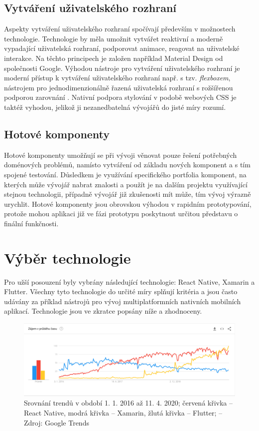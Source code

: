 \subsection{Vytváření uživatelského rozhraní}

Aspekty vytváření uživatelského rozhraní spočívají především v možnostech technologie. Technologie by měla umožnit vytvářet reaktivní a moderně vypadající uživatelská rozhraní, podporovat animace, reagovat na uživatelské interakce. Na těchto principech je založen například Material Design od společnosti Google. Výhodou nástroje pro vytváření uživatelského rozhraní je moderní přístup k vytváření uživatelského rozhraní např. s tzv. \emph{flexboxem}, nástrojem pro jednodimenzionálně řazená uživatelská rozhraní s rožšířenou podporou zarovnání \cite{FlexboxMDN}. Nativní podpora stylování v podobě webových CSS je taktéž vyhodou, jelikož ji nezanedbatelná vývojářů do jisté míry rozumí.

\subsection{Hotové komponenty}

Hotové komponenty umožňují se při vývoji věnovat pouze řešení potřebných doménových problémů, namísto vytváření od základu nových komponent a s tím spojené testování. Důsledkem je využívání specifického portfolia komponent, na kterých může vývojář nabrat znalosti a použít je na dalším projektu využívající stejnou technologii, případně vývojář již zkušenosti mít může, tím vývoj výrazně urychlit. Hotové komponenty jsou obrovskou výhodou v rapidním prototypování, protože mohou aplikaci již ve fázi prototypu poskytnout určitou představu o finální funkčnosti.

\section{Výběr technologie}

Pro užší posouzení byly vybrány následující technologie: React Native, Xamarin a Flutter. Všechny tyto technologie do určité míry splňují kritéria a jsou často udávány za příklad nástrojů pro vývoj multiplatformních nativních mobilních aplikací. Technologie jsou ve zkratce popsány níže a zhodnoceny.

\begin{figure}[h]
	\includegraphics[width=\linewidth]{img/google_trends.png}
	\caption[Srovnání trendů technologií pro mobilní vývoj]{Srovnání trendů v období 1. 1. 2016 až 11. 4. 2020; červená křivka -- React Native, modrá křivka -- Xamarin, žlutá křivka -- Flutter; -- Zdroj: Google Trends}
	\label{fig:gtrends}
\end{figure}

